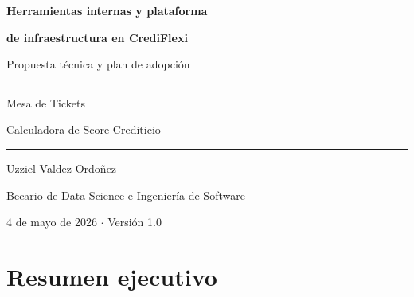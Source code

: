 \documentclass[12pt,a4paper]{article}
\begin{document}
\begin{titlepage}
\centering
\vspace*{3.5cm}

{\Large\bfseries Herramientas internas y plataforma\par}
\vspace{0.3em}
{\Large\bfseries de infraestructura en CrediFlexi\par}

\vspace{1.4cm}

{\large\color{graysoft} Propuesta técnica y plan de adopción\par}

\vspace{2.8cm}

\rule{6cm}{0.3pt}

\vspace{1em}

{\normalsize Mesa de Tickets\par}
\vspace{0.3em}
{\normalsize Calculadora de Score Crediticio\par}

\vspace{1em}

\rule{6cm}{0.3pt}

\vspace{2.8cm}

{\normalsize Uzziel Valdez Ordoñez\par}
\vspace{0.3em}
{\small\color{graysoft} Becario de Data Science e Ingeniería de Software\par}

\vfill

{\small 4 de mayo de 2026 \quad $\cdot$ \quad Versión 1.0\par}

\end{titlepage}

\thispagestyle{empty}
\tableofcontents
\newpage

\section{Resumen ejecutivo}
\end{document}
